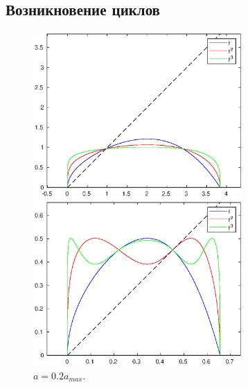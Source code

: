 \documentclass[16pt]{article}
\begin{document}
\subsection{Возникновение циклов}
\begin{figure}[h]
\begin{multicols}{2}
	\hfill
	\includegraphics[width=80mm]{f1.eps}
	\hfill
	\caption{$a = 0.001$.}
	\hfill
	\includegraphics[width=80mm]{f2.eps}
	\hfill
	\caption{$a = 0.2a_{max}.$}
    \hfill
\end{multicols}


\end{figure}
\end{document}
